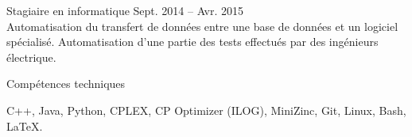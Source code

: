 \documentclass[letterpaper,MMMyyyy,nonstopmode]{simpleresumecv}
\begin{document}
\begin{Body}
Stagiaire en informatique
\hfill
Sept. 2014 -- Avr. 2015
\small \\ Automatisation du transfert de données entre une base de données et un logiciel spécialisé. Automatisation d'une partie des tests effectués par des ingénieurs électrique.\normalsize






\Section
{Compétences techniques}{}{}

C++, Java, Python, CPLEX, CP Optimizer (ILOG), MiniZinc, Git, Linux, Bash, \LaTeX.

\end{Body}
\end{document}
